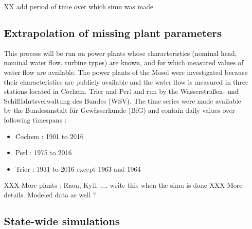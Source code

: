 XX add period of time over which simu was made

\subsection{Extrapolation of missing plant parameters}

This process will be run on power plants whose characteristics (nominal head, nominal water flow, turbine types) are known, and for which measured values of water flow are available. \newline
The power plants of the Mosel were investigated because their characteristics are publicly available \cite{mosel} and the water flow is measured in three stations located in Cochem, Trier and Perl and run by the Wasserstraßen- und Schifffahrtsverwaltung des Bundes (WSV). The time series were made available by the Bundesanstalt für Gewässerkunde (BfG) and contain daily values over following timespans :
\begin{itemize}
 \item Cochem \tabto{2cm}: 1901 to 2016
 \item Perl \tabto{2cm}: 1975 to 2016
 \item Trier \tabto{2cm}: 1931 to 2016 except 1963 and 1964
\end{itemize}
XXX More plants : Raon, Kyll, ..., write this when the simu is done
XXX More details. Modeled data as well ?

\subsection{State-wide simulations} 

